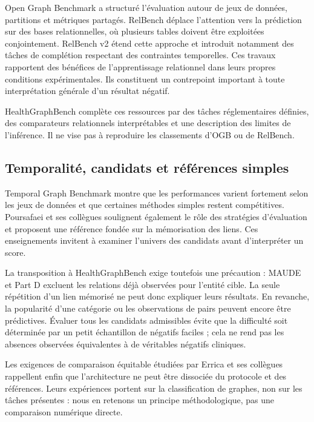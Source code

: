 Open Graph Benchmark a structuré l'évaluation autour de jeux de données, partitions et métriques partagés\cite{hu2020ogb}. RelBench déplace l'attention vers la prédiction sur des bases relationnelles, où plusieurs tables doivent être exploitées conjointement\cite{robinson2024relbench}. RelBench v2 étend cette approche et introduit notamment des tâches de complétion respectant des contraintes temporelles\cite{gu2026relbench}. Ces travaux rapportent des bénéfices de l'apprentissage relationnel dans leurs propres conditions expérimentales. Ils constituent un contrepoint important à toute interprétation générale d'un résultat négatif.

HealthGraphBench complète ces ressources par des tâches réglementaires définies, des comparateurs relationnels interprétables et une description des limites de l'inférence. Il ne vise pas à reproduire les classements d'OGB ou de RelBench.

\subsection{Temporalité, candidats et références simples}

Temporal Graph Benchmark montre que les performances varient fortement selon les jeux de données et que certaines méthodes simples restent compétitives\cite{huang2023tgb}. Poursafaei et ses collègues soulignent également le rôle des stratégies d'évaluation et proposent une référence fondée sur la mémorisation des liens\cite{poursafaei2022}. Ces enseignements invitent à examiner l'univers des candidats avant d'interpréter un score.

La transposition à HealthGraphBench exige toutefois une précaution : MAUDE et Part D excluent les relations déjà observées pour l'entité cible. La seule répétition d'un lien mémorisé ne peut donc expliquer leurs résultats. En revanche, la popularité d'une catégorie ou les observations de pairs peuvent encore être prédictives. Évaluer tous les candidats admissibles évite que la difficulté soit déterminée par un petit échantillon de négatifs faciles ; cela ne rend pas les absences observées équivalentes à de véritables négatifs cliniques.

Les exigences de comparaison équitable étudiées par Errica et ses collègues rappellent enfin que l'architecture ne peut être dissociée du protocole et des références\cite{errica2020}. Leurs expériences portent sur la classification de graphes, non sur les tâches présentes : nous en retenons un principe méthodologique, pas une comparaison numérique directe.

